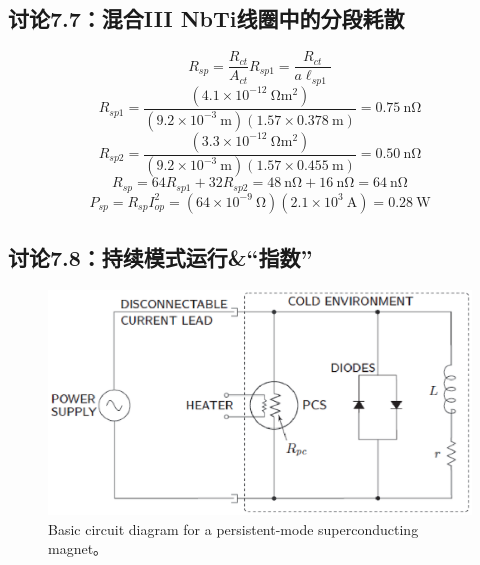 \subsection{讨论7.7：混合III NbTi线圈中的分段耗散}
\begin{equation}%
R_{sp}=\frac{R_{ct}}{A_{ct}}
R_{sp1}=\frac{R_{ct}}{a\ell_{sp1}}
\end{equation}
\begin{equation}%
R_{sp1}=\frac{(4.1\times 10^{-12}\ \mathrm{\Omega m^2})}{(9.2\times 10^{-3}\ \mathrm{m})(1.57\times 0.378\ \mathrm{m})}=0.75\ \mathrm{n\Omega}
\end{equation}
\begin{equation}%
R_{sp2}=\frac{(3.3\times 10^{-12}\ \mathrm{\Omega m^2})}{(9.2\times 10^{-3}\ \mathrm{m})(1.57\times 0.455\ \mathrm{m})}=0.50\ \mathrm{n\Omega}
\end{equation}
\begin{equation}%
R_{sp}=64R_{sp1}+32R_{sp2}=48\ \mathrm{n\Omega}+16\ \mathrm{n\Omega}=64\ \mathrm{n\Omega}
\end{equation}
\begin{equation}%
P_{sp}=R_{sp}I_{op}^{2}=(64\times 10^{-9}\ \mathrm{\Omega})(2.1\times 10^3\ \mathrm{A})=0.28\ \mathrm{W}
\end{equation}




\subsection{讨论7.8：持续模式运行\&“指数”}

\begin{figure}[htbp]
	\centering
	\includegraphics[scale=0.7]{chpt7/figs/fig7.22.eps}
	\caption{Basic circuit diagram for a persistent-mode superconducting magnet。}
\end{figure}




